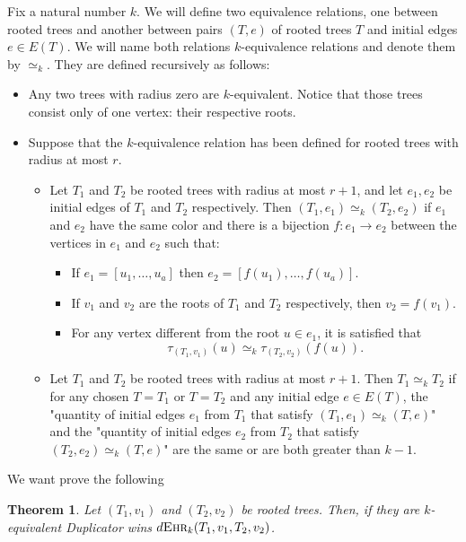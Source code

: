 \documentclass[12pt,notitlepage,a4paper]{article}
\newtheorem{theorem}{Theorem}[section]
\theoremstyle{definition}
\newcommand{\morph}[1]{\simeq_#1}
\newcommand{\ehr}{\textsc{Ehr}}
\begin{document}
Fix a natural number $k$. We will define 
two equivalence relations, one between 
rooted trees and another between pairs
$(T,e)$ of rooted trees $T$ and initial edges
$e\in E(T)$. We will name both relations
$k$-equivalence relations and
denote them by $\morph{k}$. 
They are defined recursively as follows:

\begin{itemize}
	\item Any two trees with radius zero are $k$-equivalent.
	Notice that those trees
	consist only of one vertex: their respective roots.
	\item Suppose that the $k$-equivalence relation has been
	defined for rooted trees with radius at most $r$.
	\begin{itemize}
		\item Let $T_1$ and $T_2$ be rooted trees with radius
		at most $r+1$, and let $e_1, e_2$
		be initial edges of $T_1$ and $T_2$ respectively.
		Then $(T_1,e_1)\simeq_k (T_2,e_2)$ if
		$e_1$ and $e_2$ have the same color and there is a bijection 
		$f: e_1\rightarrow e_2$ between the vertices in $e_1$ and
		$e_2$ such that:
		\begin{itemize}
			\item If $e_1=[u_1,\dots, u_a]$ then $e_2=[f(u_1),\dots,f(u_a)]$.
			\item If $v_1$ and $v_2$ are the roots of
			$T_1$ and $T_2$ respectively, then $v_2=f(v_1)$.
			\item For any vertex different from the root $u\in e_1$, it is satisfied that
			\[\tau_{(T_1,v_1)}(u)\morph{k} \tau_{(T_2,v_2)}(f(u)).\]
		\end{itemize}
		\item Let $T_1$ and $T_2$ be rooted trees with
		radius at most $r+1$. Then $T_1\morph{k} T_2$ if
		for any chosen $T=T_1$ or $T=T_2$ and any initial edge
		$e\in E(T)$, the "quantity 
		of initial edges $e_1$ from $T_1$ that satisfy
		$(T_1,e_1)\simeq_k (T, e)$" and the "quantity 
		of initial edges $e_2$ from $T_2$ that satisfy
		$(T_2,e_2)\simeq_k (T, e)$" are the same or 
		are both greater than $k-1$.
		
	\end{itemize}
\end{itemize}

We want prove the following
\begin{theorem} \label{thm:equivalenttrees} 
	Let $(T_1,v_1)$ and $(T_2,v_2)$ be rooted trees.
	Then, if they are $k$-equivalent Duplicator wins
	$d\ehr_{k}(T_1,v_1,T_2,v_2)$.
\end{theorem}
\end{document}

